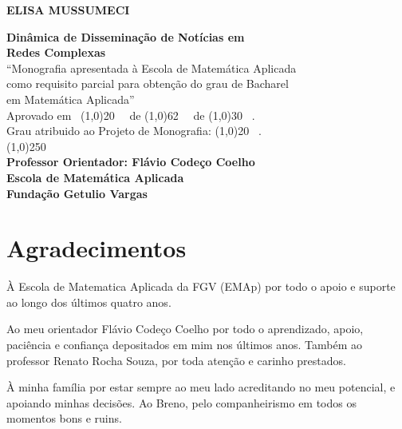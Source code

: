 \documentclass[a4paper,12pt]{article}
\begin{document}
\begin{titlepage}
 \begin{center}
 
  {\bf \large ELISA MUSSUMECI}\\[0.3cm]

  \vspace{25 mm}

  {\bf \large Dinâmica de Disseminação de Notícias em}\\[0.1cm]
  {\bf \large Redes Complexas}\\[4cm]

  {“Monografia apresentada à Escola de Matemática Aplicada}\\[0.1cm]
  {como requisito parcial para obtenção do grau de Bacharel }\\[0.1cm]
  {em Matemática Aplicada”}\\[6cm]


  {Aprovado em \ \line(1,0){20} \ \ de \line(1,0){62} \ \ de \line(1,0){30} \ .}\\[0.1cm]
  {Grau atribuido ao Projeto de Monografia: \line(1,0){20} \ . }\\[3cm]
  
  
  {\line(1,0){250}}\\
  {\bf Professor Orientador: Flávio Codeço Coelho}\\[0.1cm]
  {\bf Escola de Matemática Aplicada}\\[0.1cm]
  {\bf Fundação Getulio Vargas}
 \end{center}
\end{titlepage}

\newpage\null\thispagestyle{empty}\newpage

\tableofcontents

\pagebreak

\listoffigures

\pagebreak

\section*{Agradecimentos}
\doublespacing
À Escola de Matematica Aplicada da FGV (EMAp) por todo o apoio e suporte ao longo dos últimos quatro anos. 

Ao meu orientador Flávio Codeço Coelho por todo o aprendizado, apoio, paciência e confiança depositados em mim nos últimos anos. Também ao
professor Renato Rocha Souza, por toda atenção e carinho prestados.

À minha família por estar sempre ao meu lado acreditando no meu potencial, e apoiando minhas decisões. Ao
Breno, pelo companheirismo em todos os momentos bons e ruins.
\end{document}
